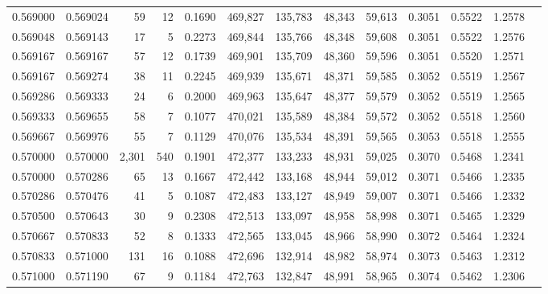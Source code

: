 \begin{tabular}{rrrrrrrrrrrrr}
0.569000 & 0.569024 &    59 &  12 &                                     0.1690 & 469,827 & 135,783 &  48,343 &  59,613 & 0.3051 & 0.5522 & 1.2578 \\
0.569048 & 0.569143 &    17 &   5 &                                     0.2273 & 469,844 & 135,766 &  48,348 &  59,608 & 0.3051 & 0.5522 & 1.2576 \\
0.569167 & 0.569167 &    57 &  12 &                                     0.1739 & 469,901 & 135,709 &  48,360 &  59,596 & 0.3051 & 0.5520 & 1.2571 \\
0.569167 & 0.569274 &    38 &  11 &                                     0.2245 & 469,939 & 135,671 &  48,371 &  59,585 & 0.3052 & 0.5519 & 1.2567 \\
0.569286 & 0.569333 &    24 &   6 &                                     0.2000 & 469,963 & 135,647 &  48,377 &  59,579 & 0.3052 & 0.5519 & 1.2565 \\
0.569333 & 0.569655 &    58 &   7 &                                     0.1077 & 470,021 & 135,589 &  48,384 &  59,572 & 0.3052 & 0.5518 & 1.2560 \\
0.569667 & 0.569976 &    55 &   7 &                                     0.1129 & 470,076 & 135,534 &  48,391 &  59,565 & 0.3053 & 0.5518 & 1.2555 \\
0.570000 & 0.570000 & 2,301 & 540 &                                     0.1901 & 472,377 & 133,233 &  48,931 &  59,025 & 0.3070 & 0.5468 & 1.2341 \\
0.570000 & 0.570286 &    65 &  13 &                                     0.1667 & 472,442 & 133,168 &  48,944 &  59,012 & 0.3071 & 0.5466 & 1.2335 \\
0.570286 & 0.570476 &    41 &   5 &                                     0.1087 & 472,483 & 133,127 &  48,949 &  59,007 & 0.3071 & 0.5466 & 1.2332 \\
0.570500 & 0.570643 &    30 &   9 &                                     0.2308 & 472,513 & 133,097 &  48,958 &  58,998 & 0.3071 & 0.5465 & 1.2329 \\
0.570667 & 0.570833 &    52 &   8 &                                     0.1333 & 472,565 & 133,045 &  48,966 &  58,990 & 0.3072 & 0.5464 & 1.2324 \\
0.570833 & 0.571000 &   131 &  16 &                                     0.1088 & 472,696 & 132,914 &  48,982 &  58,974 & 0.3073 & 0.5463 & 1.2312 \\
0.571000 & 0.571190 &    67 &   9 &                                     0.1184 & 472,763 & 132,847 &  48,991 &  58,965 & 0.3074 & 0.5462 & 1.2306 \\

\end{tabular}
